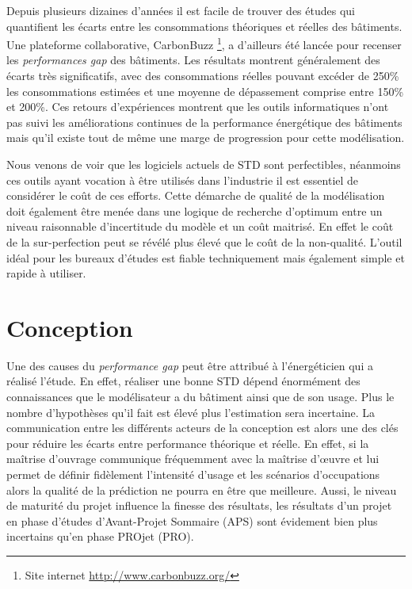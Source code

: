Depuis plusieurs dizaines d'années il est facile de trouver des études qui quantifient les écarts entre les consommations théoriques et réelles des bâtiments. Une plateforme collaborative, CarbonBuzz \footnote{Site internet \url{http://www.carbonbuzz.org/}}, a d'ailleurs été lancée pour recenser les \textit{performances gap} des bâtiments. Les résultats montrent généralement des écarts très significatifs, avec des consommations réelles pouvant excéder de 250\% les consommations estimées et une moyenne de dépassement comprise entre 150\% et 200\%. Ces retours d'expériences montrent que les outils informatiques n'ont pas suivi les améliorations continues de la performance énergétique des bâtiments mais qu'il existe tout de même une marge de progression pour cette modélisation.

Nous venons de voir que les logiciels actuels de STD sont perfectibles, néanmoins ces outils ayant vocation à être utilisés dans l'industrie il est essentiel de considérer le coût de ces efforts. Cette démarche de qualité de la modélisation doit également être menée dans une logique de recherche d'optimum entre un niveau raisonnable d'incertitude du modèle et un coût maitrisé. En effet le coût de la sur-perfection peut se révélé plus élevé que le coût de la non-qualité. L'outil idéal pour les bureaux d'études est fiable techniquement mais également simple et rapide à utiliser.

\section{Conception}

Une des causes du \textit{performance gap} peut être attribué à l'énergéticien qui a réalisé l'étude. En effet, réaliser une bonne STD dépend énormément des connaissances que le modélisateur a du bâtiment ainsi que de son usage. Plus le nombre d'hypothèses qu'il fait est élevé plus l'estimation sera incertaine. La communication entre les différents acteurs de la conception est alors une des clés pour réduire les écarts entre performance théorique et réelle. En effet, si la maîtrise d'ouvrage communique fréquemment avec la maîtrise d'œuvre et lui permet de définir fidèlement l'intensité d'usage et les scénarios d'occupations alors la qualité de la prédiction ne pourra en être que meilleure. Aussi, le niveau de maturité du projet influence la finesse des résultats, les résultats d'un projet en phase d'études d'Avant-Projet Sommaire (APS) sont évidement bien plus incertains qu'en phase PROjet (PRO). 

